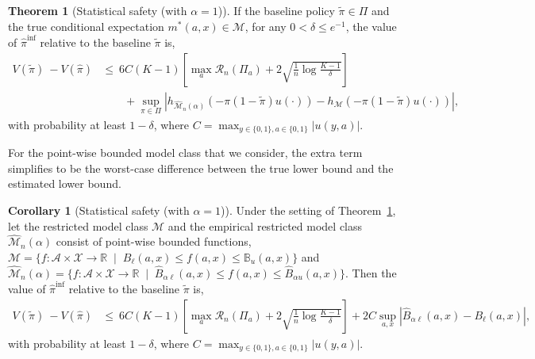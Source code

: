 \documentclass[12pt]{article}
\theoremstyle{definition}
\newtheorem{theorem}{Theorem}
\newtheorem{corollary}{Corollary}
\newcommand{\R}{\ensuremath{\mathbb{R}}}
\newcommand{\B}{\ensuremath{\mathbb{B}}}
\newcommand{\<}{\langle}
\renewcommand{\>}{\rangle}
\newcommand\mcal[1]{\ensuremath{\mathcal{#1}}}
\begin{document}
\begin{theorem}[Statistical safety (with $\alpha = 1$)]
  \label{thm:emp_safety_full} \singlespacing
  If the baseline policy
  $\tilde{\pi} \in \Pi$ and the true conditional expectation
  $m^\ast(a,x) \in \mcal{M}$, for any $0 < \delta \leq e^{-1}$, the value of
  $\hat{\pi}^\text{inf}$ relative to the baseline $\tilde{\pi}$ is,
  \begin{align*}
    V(\tilde{\pi})\ - V(\hat{\pi}) & \leq   \ 6 C (K-1) \left[\max_{a} \mathcal{R}_n(\Pi_a) + 2\sqrt{\frac{1}{n}\log \frac{K-1}{\delta}} \right]\\
    & \qquad + \sup_{\pi \in \Pi} |h_{\widehat{\mathcal{M}}_n(\alpha)}\left(-\pi (1 - \tilde{\pi}) u(\cdot)\right) - h_\mathcal{\mathcal{M}}\left(-\pi (1 - \tilde{\pi}) u(\cdot)\right)|,
  \end{align*}
  with probability at least $ 1- \delta$,
  where $C = \max_{y \in \{0,1\}, a \in \{0, 1\}} |u(y, a)|$.
\end{theorem}

For the point-wise bounded model class that we consider, the extra term simplifies to be the worst-case difference between the true lower bound and the estimated lower bound.

\begin{corollary}[Statistical safety (with $\alpha = 1$)]
  \label{cor:emp_safety_full_pointwise} \singlespacing
  Under the setting of Theorem~\ref{thm:emp_safety_full},
  let the restricted model class $\mathcal{M}$ and the empirical restricted model class  $\widehat{\mathcal{M}}_n(\alpha)$ consist of point-wise bounded functions,  $\mathcal{M} = \{f: \mathcal{A} \times \mcal{X} \to \R \; \mid \; B_{\ell}(a,x) \leq f(a, x) \leq \B_{u}(a, x)\}$ and  $\widehat{\mathcal{M}}_n(\alpha) = \{f: \mathcal{A} \times \mcal{X} \to \R \; \mid \; \widehat{B}_{\alpha\ell}(a,x) \leq f(a, x) \leq \widehat{B}_{\alpha u}(a, x)\}$.
  Then the value of
  $\hat{\pi}^\text{inf}$ relative to the baseline $\tilde{\pi}$ is,
  \begin{align*}
    V(\tilde{\pi})\ - V(\hat{\pi}) & \leq   \ 6 C (K-1) \left[\max_{a} \mathcal{R}_n(\Pi_a) + 2\sqrt{\frac{1}{n}\log \frac{K-1}{\delta}} \right] + 2C \sup_{a, x}|\widehat{B}_{\alpha \ell}(a,x) - B_\ell(a, x)|,
  \end{align*}
  with probability at least $ 1- \delta$,
  where $C = \max_{y \in \{0,1\}, a \in \{0, 1\}} |u(y, a)|$.
\end{corollary}
\end{document}
